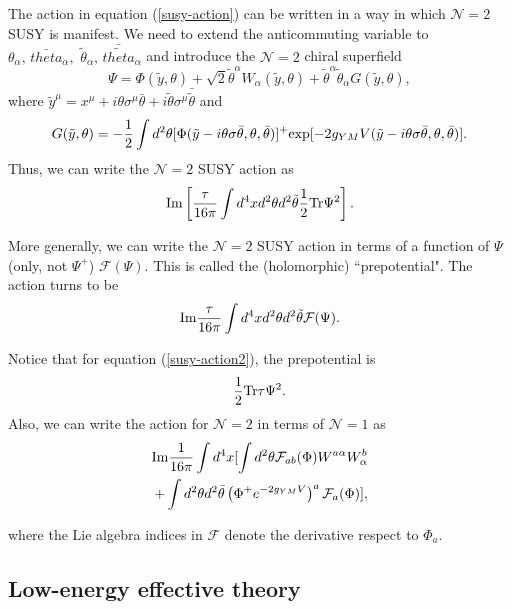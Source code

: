 \documentclass[12pt, onecolumn]{article}
\begin{document}
The action in equation (\ref{susy-action}) can be written in a way in which  $\mathcal{N}=2$ SUSY is manifest. We need to extend the anticommuting variable to $\theta_\alpha,\,\bar{theta}_{\dot{\alpha}},\,\,\tilde{\theta}_\alpha,\,\bar{\tilde{theta}}_{\dot{\alpha}}$ and introduce the $\mathcal{N}=2$ chiral superfield
\begin{equation}
\Psi= \Phi(\tilde{y},\theta)+\sqrt{2}\tilde{\theta}^\alpha W_\alpha(\tilde{y},\theta)+\tilde{\theta}^\alpha\tilde{\theta}_\alpha G(\tilde{y},\theta),
\end{equation}
where $\tilde{y}^\mu = x^\mu+i \theta \sigma^\mu \bar{\theta} + i \tilde{\theta} \sigma^\mu \bar{\tilde{\theta}}$ and $$ G (\tilde{y},\theta) =-\frac{1}{2}\int d^2\theta  [\Phi(\tilde{y}-i \theta \sigma \bar{\theta},\theta,\bar{\theta})]^+ {\rm exp}[-2g_{YM} V(\tilde{y}-i \theta \sigma \bar{\theta},\theta,\bar{\theta})].$$ Thus, we can write the $\mathcal{N}=2$ SUSY action as
\begin{equation}
{\rm Im}\left[ \frac{\tau}{16\pi}\int d^4x d^2 \theta d^2 \tilde{\theta} \frac{1}{2}{\rm Tr} \Psi^2\right]. \label{susy-action2}
\end{equation}

More generally, we can write the $\mathcal{N}=2$ SUSY action in terms of a function of $\Psi$ (only, not $\Psi^+$) $\mathcal{F}(\Psi)$. This is called the (holomorphic) ``prepotential". The action turns to be 
\begin{equation}
{\rm Im} \frac{\tau}{16\pi}\int d^4x d^2 \theta d^2 \tilde{\theta}\mathcal{F}(\Psi) . \label{susy-action3}
\end{equation}

Notice that for equation (\ref{susy-action2}), the prepotential is $$\frac{1}{2}{\rm Tr} \tau \Psi^2.$$ Also, we can write the action for  $\mathcal{N}=2$ in terms of  $\mathcal{N}=1$ as 
\begin{eqnarray}
{\rm Im} \frac{1}{16\pi}\int d^4x [ \int d^2 \theta \mathcal{F}_{ab}(\Phi) W^{a \alpha}W^b_\alpha \nonumber \\
+ \int d^2\theta d^2 \bar{\theta} \left(\Phi^+ e^{-2g_{YM}V}\right)^a \mathcal{F}_a(\Phi)],
\end{eqnarray}
 
 where the Lie algebra indices in $\mathcal{F}$ denote the derivative respect to $\Phi_a$. 
 
 \subsection{Low-energy effective theory}
\end{document}
